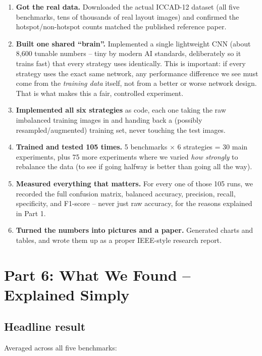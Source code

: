 \documentclass[11pt]{article}
\begin{document}
\begin{enumerate}[leftmargin=1.3em]
    \item \textbf{Got the real data.} Downloaded the actual ICCAD-12
    dataset (all five benchmarks, tens of thousands of real layout
    images) and confirmed the hotspot/non-hotspot counts matched the
    published reference paper.
    \item \textbf{Built one shared ``brain''.} Implemented a single
    lightweight CNN (about 8,600 tunable numbers -- tiny by modern AI
    standards, deliberately so it trains fast) that every strategy
    uses identically. This is important: if every strategy uses the
    exact same network, any performance difference we see must come
    from the \emph{training data} itself, not from a better or worse
    network design. That is what makes this a fair, controlled
    experiment.
    \item \textbf{Implemented all six strategies} as code, each one
    taking the raw imbalanced training images in and handing back a
    (possibly resampled/augmented) training set, never touching the
    test images.
    \item \textbf{Trained and tested 105 times.} 5 benchmarks
    $\times$ 6 strategies = 30 main experiments, plus 75 more
    experiments where we varied \emph{how strongly} to rebalance the
    data (to see if going halfway is better than going all the way).
    \item \textbf{Measured everything that matters.} For every one of
    those 105 runs, we recorded the full confusion matrix, balanced
    accuracy, precision, recall, specificity, and F1-score -- never
    just raw accuracy, for the reasons explained in Part 1.
    \item \textbf{Turned the numbers into pictures and a paper.}
    Generated charts and tables, and wrote them up as a proper
    IEEE-style research report.
\end{enumerate}

\section{Part 6: What We Found -- Explained Simply}

\subsection{Headline result}
Averaged across all five benchmarks:
\end{document}
